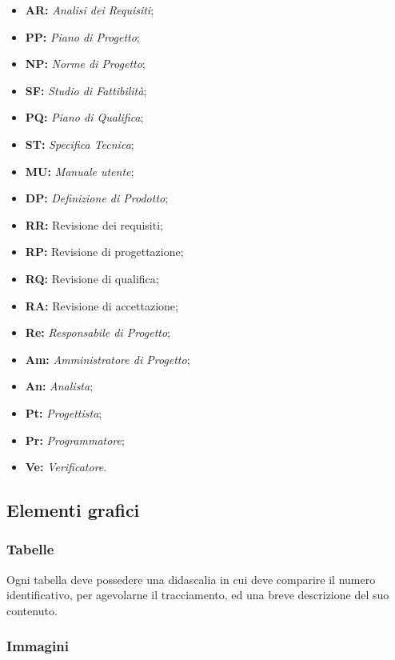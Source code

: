 \documentclass[NormediProgetto.tex]{subfiles}
\begin{document}
\begin{itemize}
\item{\textbf{AR:}} \textit{Analisi dei Requisiti};
\item{\textbf{PP:}} \textit{Piano di Progetto};
\item{\textbf{NP:}} \textit{Norme di Progetto};
\item{\textbf{SF:}} \textit{Studio di Fattibilità};
\item{\textbf{PQ:}} \textit{Piano di Qualifica};
\item{\textbf{ST:}} \textit{Specifica Tecnica};
\item{\textbf{MU:}} \textit{Manuale utente};
\item{\textbf{DP:}} \textit{Definizione di Prodotto};
\item{\textbf{RR:}} Revisione dei requisiti;
\item{\textbf{RP:}} Revisione di progettazione;
\item{\textbf{RQ:}} Revisione di qualifica;
\item{\textbf{RA:}} Revisione di accettazione;
\item{\textbf{Re:}} \textit{Responsabile di Progetto};
\item{\textbf{Am:}} \textit{Amministratore di Progetto};
\item{\textbf{An:}} \textit{Analista};
\item{\textbf{Pt:}} \textit{Progettista};
\item{\textbf{Pr:}} \textit{Programmatore};
\item{\textbf{Ve:}} \textit{Verificatore}.
\end{itemize}

\subsection{Elementi grafici}

\subsubsection{Tabelle}

Ogni tabella deve possedere una didascalia in cui deve comparire il numero identificativo, per agevolarne il tracciamento, ed una breve descrizione del suo contenuto.

\subsubsection{Immagini}
\end{document}
